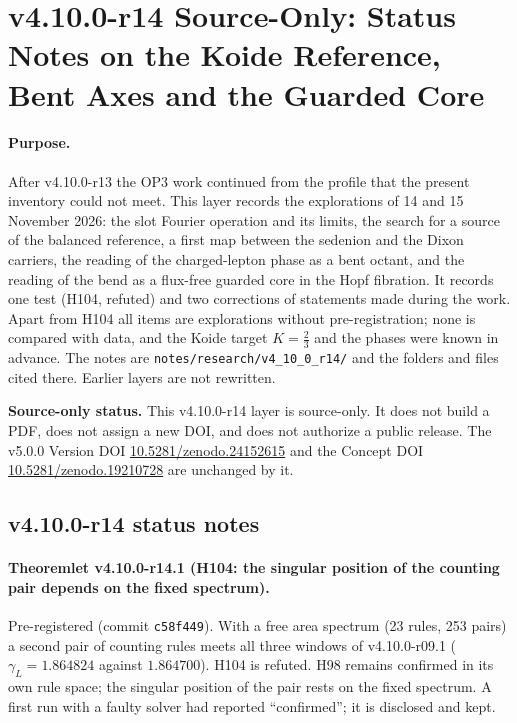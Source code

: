 
\clearpage
\section*{v4.10.0-r14 Source-Only: Status Notes on the Koide Reference, Bent Axes and the Guarded Core}
\label{sec:v4100-r14-bent-axes-guarded-core}

\paragraph{Purpose.}
After v4.10.0-r13 the OP3 work continued from the profile that the present inventory could not meet.  This layer records
the explorations of 14 and 15 November 2026: the slot Fourier operation and its limits, the search for a source of the
balanced reference, a first map between the sedenion and the Dixon carriers, the reading of the charged-lepton phase as a
bent octant, and the reading of the bend as a flux-free guarded core in the Hopf fibration.  It records one test (H104,
refuted) and two corrections of statements made during the work.  Apart from H104 all items are explorations without
pre-registration; none is compared with data, and the Koide target \(K=\tfrac23\) and the phases were known in advance.  The
notes are \texttt{notes/\allowbreak research/\allowbreak v4\_10\_0\_r14/} and the folders and files cited there.  Earlier layers
are not rewritten.

\noindent\textbf{Source-only status.}
This v4.10.0-r14 layer is source-only.  It does not build a PDF, does not assign a new DOI,
and does not authorize a public release.  The v5.0.0 Version DOI
\href{https://doi.org/10.5281/zenodo.24152615}{10.5281/zenodo.24152615} and the Concept DOI
\href{https://doi.org/10.5281/zenodo.19210728}{10.5281/zenodo.19210728} are unchanged by it.

\subsection*{v4.10.0-r14 status notes}
\label{subsec:v4100-r14-status}

\paragraph{Theoremlet v4.10.0-r14.1 (H104: the singular position of the counting pair depends on the fixed spectrum).}
Pre-registered (commit \texttt{c58f449}).  With a free area spectrum (23 rules, 253 pairs) a second pair of counting rules
meets all three windows of v4.10.0-r09.1 (\(\gamma_L=1.864824\) against \(1.864700\)).  H104 is refuted.  H98 remains confirmed
in its own rule space; the singular position of the pair rests on the fixed spectrum.  A first run with a faulty solver had
reported ``confirmed''; it is disclosed and kept.

